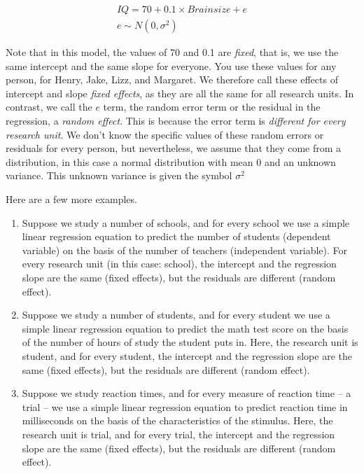 \documentclass[]{book}\usepackage[]{graphicx}\usepackage[]{color}
\begin{document}
\begin{eqnarray}
IQ = 70 + 0.1 \times Brainsize + e \\
e \sim N(0, \sigma^2)
\end{eqnarray}

Note that in this model, the values of 70 and 0.1 are \textit{fixed}, that is, we use the same intercept and the same slope for everyone. You use these values for any person, for Henry, Jake, Lizz, and Margaret. We therefore call these effects of intercept and slope \textit{fixed effects}, as they are all the same for all research units. In contrast, we call the $e$ term, the random error term or the residual in the regression, a \textit{random effect}. This is because the error term is \textit{different for every research unit}. We don't know the specific values of these random errors or residuals for every person, but nevertheless, we assume that they come from a distribution, in this case a normal distribution with mean 0 and an unknown variance. This unknown variance is given the symbol $\sigma^2$ 

Here are a few more examples. 

\begin{enumerate}
\item Suppose we study a number of schools, and for every school we use a simple linear regression equation to predict the number of students (dependent variable) on the basis of the number of teachers (independent variable). For every research unit (in this case: school), the intercept and the regression slope are the same (fixed effects), but the residuals are different (random effect). 

\item Suppose we study a number of students, and for every student we use a simple linear regression equation to predict the math test score on the basis of the number of hours of study the student puts in. Here, the research unit is student, and for every student, the  intercept and the regression slope are the same (fixed effects), but the residuals are different (random effect).

\item Suppose we study reaction times, and for every measure of reaction time -- a trial -- we use a simple linear regression equation to predict reaction time in milliseconds on the basis of the characteristics of the stimulus. Here, the research unit is trial, and for every trial, the intercept and the regression slope are the same (fixed effects), but the residuals are different (random effect).
\end{enumerate}
\end{document}
